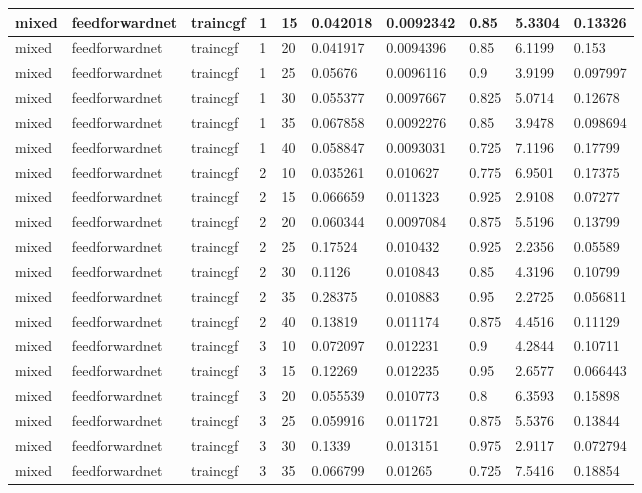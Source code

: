 \begin{longtable}{lllllllll}
mixed & feedforwardnet & traincgf & 1 & 15 & 0.042018 & 0.0092342 & 0.85 & 5.3304 & 0.13326 \\ \hline 
mixed & feedforwardnet & traincgf & 1 & 20 & 0.041917 & 0.0094396 & 0.85 & 6.1199 & 0.153 \\ \hline 
mixed & feedforwardnet & traincgf & 1 & 25 & 0.05676 & 0.0096116 & 0.9 & 3.9199 & 0.097997 \\ \hline 
mixed & feedforwardnet & traincgf & 1 & 30 & 0.055377 & 0.0097667 & 0.825 & 5.0714 & 0.12678 \\ \hline 
mixed & feedforwardnet & traincgf & 1 & 35 & 0.067858 & 0.0092276 & 0.85 & 3.9478 & 0.098694 \\ \hline 
mixed & feedforwardnet & traincgf & 1 & 40 & 0.058847 & 0.0093031 & 0.725 & 7.1196 & 0.17799 \\ \hline 
mixed & feedforwardnet & traincgf & 2 & 10 & 0.035261 & 0.010627 & 0.775 & 6.9501 & 0.17375 \\ \hline 
mixed & feedforwardnet & traincgf & 2 & 15 & 0.066659 & 0.011323 & 0.925 & 2.9108 & 0.07277 \\ \hline 
mixed & feedforwardnet & traincgf & 2 & 20 & 0.060344 & 0.0097084 & 0.875 & 5.5196 & 0.13799 \\ \hline 
mixed & feedforwardnet & traincgf & 2 & 25 & 0.17524 & 0.010432 & 0.925 & 2.2356 & 0.05589 \\ \hline 
mixed & feedforwardnet & traincgf & 2 & 30 & 0.1126 & 0.010843 & 0.85 & 4.3196 & 0.10799 \\ \hline 
mixed & feedforwardnet & traincgf & 2 & 35 & 0.28375 & 0.010883 & 0.95 & 2.2725 & 0.056811 \\ \hline 
mixed & feedforwardnet & traincgf & 2 & 40 & 0.13819 & 0.011174 & 0.875 & 4.4516 & 0.11129 \\ \hline 
mixed & feedforwardnet & traincgf & 3 & 10 & 0.072097 & 0.012231 & 0.9 & 4.2844 & 0.10711 \\ \hline 
mixed & feedforwardnet & traincgf & 3 & 15 & 0.12269 & 0.012235 & 0.95 & 2.6577 & 0.066443 \\ \hline 
mixed & feedforwardnet & traincgf & 3 & 20 & 0.055539 & 0.010773 & 0.8 & 6.3593 & 0.15898 \\ \hline 
mixed & feedforwardnet & traincgf & 3 & 25 & 0.059916 & 0.011721 & 0.875 & 5.5376 & 0.13844 \\ \hline 
mixed & feedforwardnet & traincgf & 3 & 30 & 0.1339 & 0.013151 & 0.975 & 2.9117 & 0.072794 \\ \hline 
mixed & feedforwardnet & traincgf & 3 & 35 & 0.066799 & 0.01265 & 0.725 & 7.5416 & 0.18854 \\ \hline 

\end{longtable}
